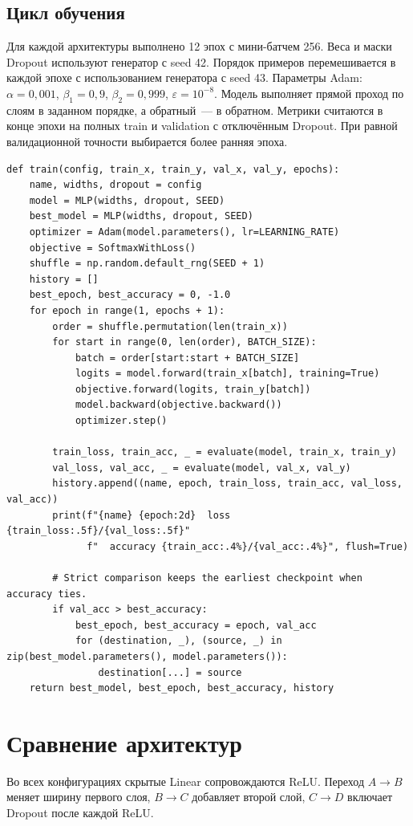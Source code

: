 \clearpage
\subsection{Цикл обучения}
Для каждой архитектуры выполнено 12 эпох с мини-батчем 256. Веса и маски Dropout используют генератор с seed 42. Порядок примеров перемешивается в каждой эпохе с использованием генератора с seed 43. Параметры Adam: \(\alpha=0{,}001\), \(\beta_1=0{,}9\), \(\beta_2=0{,}999\), \(\varepsilon=10^{-8}\). Модель выполняет прямой проход по слоям в заданном порядке, а обратный~--- в обратном. Метрики считаются в конце эпохи на полных train и validation с отключённым Dropout. При равной валидационной точности выбирается более ранняя эпоха.
{\codefont
\begin{verbatim}
def train(config, train_x, train_y, val_x, val_y, epochs):
    name, widths, dropout = config
    model = MLP(widths, dropout, SEED)
    best_model = MLP(widths, dropout, SEED)
    optimizer = Adam(model.parameters(), lr=LEARNING_RATE)
    objective = SoftmaxWithLoss()
    shuffle = np.random.default_rng(SEED + 1)
    history = []
    best_epoch, best_accuracy = 0, -1.0
    for epoch in range(1, epochs + 1):
        order = shuffle.permutation(len(train_x))
        for start in range(0, len(order), BATCH_SIZE):
            batch = order[start:start + BATCH_SIZE]
            logits = model.forward(train_x[batch], training=True)
            objective.forward(logits, train_y[batch])
            model.backward(objective.backward())
            optimizer.step()

        train_loss, train_acc, _ = evaluate(model, train_x, train_y)
        val_loss, val_acc, _ = evaluate(model, val_x, val_y)
        history.append((name, epoch, train_loss, train_acc, val_loss, val_acc))
        print(f"{name} {epoch:2d}  loss {train_loss:.5f}/{val_loss:.5f}"
              f"  accuracy {train_acc:.4%}/{val_acc:.4%}", flush=True)

        # Strict comparison keeps the earliest checkpoint when accuracy ties.
        if val_acc > best_accuracy:
            best_epoch, best_accuracy = epoch, val_acc
            for (destination, _), (source, _) in zip(best_model.parameters(), model.parameters()):
                destination[...] = source
    return best_model, best_epoch, best_accuracy, history
\end{verbatim}
}

\section{Сравнение архитектур}
Во всех конфигурациях скрытые Linear сопровождаются ReLU. Переход \(A\to B\) меняет ширину первого слоя, \(B\to C\) добавляет второй слой, \(C\to D\) включает Dropout после каждой ReLU.

